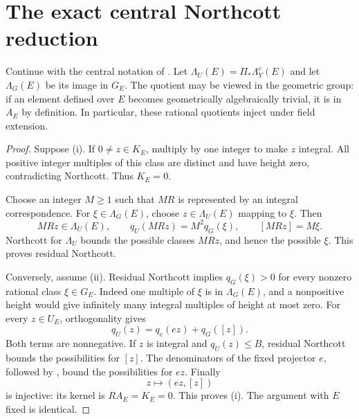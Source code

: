 \section{The exact central Northcott reduction}
\label{sec:central-northcott}

Continue with the central notation of
. Let
\(\Lambda_U(E)=\Pi_*\Lambda_Y^c(E)\) and let
\(\Lambda_G(E)\) be its image in \(G_E\). The quotient may be
viewed in the geometric group: if an element defined over \(E\)
becomes geometrically algebraically trivial, it is in \(A_E\) by
definition. In particular, these rational quotients inject under
field extension.


\begin{proof}
Suppose (i). If \(0\ne z\in K_E\), multiply by one integer to
make \(z\) integral. All positive integer multiples of this class
are distinct and have height zero, contradicting Northcott.
Thus \(K_E=0\).

Choose an integer \(M\ge1\) such that \(MR\) is represented by
an integral correspondence. For \(\xi\in\Lambda_G(E)\), choose
\(z\in\Lambda_U(E)\) mapping to \(\xi\). Then
\[
 MRz\in\Lambda_U(E),\qquad
 q_U(MRz)=M^2q_G(\xi),\qquad [MRz]=M\xi.
\]
Northcott for \(\Lambda_U\) bounds the possible classes \(MRz\),
and hence the possible \(\xi\). This proves residual Northcott.

Conversely, assume (ii). Residual Northcott implies
\(q_G(\xi)>0\) for every nonzero rational class \(\xi\in G_E\).
Indeed one multiple of \(\xi\) is in \(\Lambda_G(E)\), and a
nonpositive height would give infinitely many integral multiples
of height at most zero. For every \(z\in U_E\), orthogonality gives
\begin{equation}\label{eq:central-norm-split}
 q_U(z)=q_e(ez)+q_G([z]).
\end{equation}
Both terms are nonnegative. If \(z\) is integral and
\(q_U(z)\le B\), residual Northcott bounds the possibilities for
\([z]\). The denominators of the fixed projector \(e\), followed
by , bound the possibilities for \(ez\).
Finally
\[
 z\longmapsto(ez,[z])
\]
is injective: its kernel is \(RA_E=K_E=0\). This proves (i).
The argument with \(E\) fixed is identical.
\end{proof}

